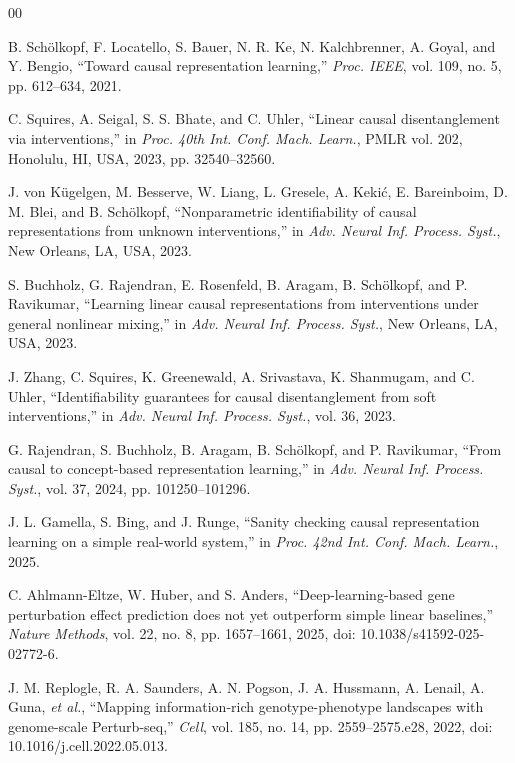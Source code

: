 \documentclass[journal,twoside,web]{ieeecolor}
\begin{document}
\begin{thebibliography}{00}

B. Sch\"{o}lkopf, F. Locatello, S. Bauer, N. R. Ke, N. Kalchbrenner, A. Goyal,
and Y. Bengio, ``Toward causal representation learning,'' \emph{Proc. IEEE},
vol. 109, no. 5, pp. 612--634, 2021.

C. Squires, A. Seigal, S. S. Bhate, and C. Uhler, ``Linear causal
disentanglement via interventions,'' in \emph{Proc. 40th Int. Conf. Mach.
Learn.}, PMLR vol. 202, Honolulu, HI, USA, 2023, pp. 32540--32560.

J. von K\"{u}gelgen, M. Besserve, W. Liang, L. Gresele, A. Keki\'{c},
E. Bareinboim, D. M. Blei, and B. Sch\"{o}lkopf, ``Nonparametric
identifiability of causal representations from unknown interventions,'' in
\emph{Adv. Neural Inf. Process. Syst.}, New Orleans, LA, USA, 2023.

S. Buchholz, G. Rajendran, E. Rosenfeld, B. Aragam, B. Sch\"{o}lkopf, and
P. Ravikumar, ``Learning linear causal representations from interventions
under general nonlinear mixing,'' in \emph{Adv. Neural Inf. Process. Syst.},
New Orleans, LA, USA, 2023.

J. Zhang, C. Squires, K. Greenewald, A. Srivastava, K. Shanmugam, and
C. Uhler, ``Identifiability guarantees for causal disentanglement from soft
interventions,'' in \emph{Adv. Neural Inf. Process. Syst.}, vol. 36, 2023.

G. Rajendran, S. Buchholz, B. Aragam, B. Sch\"{o}lkopf, and P. Ravikumar,
``From causal to concept-based representation learning,'' in \emph{Adv. Neural
Inf. Process. Syst.}, vol. 37, 2024, pp. 101250--101296.

J. L. Gamella, S. Bing, and J. Runge, ``Sanity checking causal representation
learning on a simple real-world system,'' in \emph{Proc. 42nd Int. Conf. Mach.
Learn.}, 2025.

C. Ahlmann-Eltze, W. Huber, and S. Anders, ``Deep-learning-based gene
perturbation effect prediction does not yet outperform simple linear
baselines,'' \emph{Nature Methods}, vol. 22, no. 8, pp. 1657--1661, 2025,
doi: 10.1038/s41592-025-02772-6.

J. M. Replogle, R. A. Saunders, A. N. Pogson, J. A. Hussmann, A. Lenail,
A. Guna, \emph{et al.}, ``Mapping information-rich genotype-phenotype
landscapes with genome-scale Perturb-seq,'' \emph{Cell}, vol. 185, no. 14,
pp. 2559--2575.e28, 2022, doi: 10.1016/j.cell.2022.05.013.


\end{thebibliography}
\end{document}
